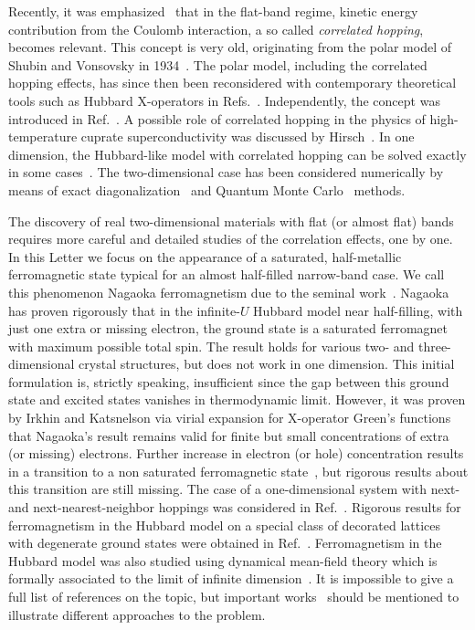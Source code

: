 Recently, it was emphasized~\cite{cea2021electrostatic} that in the flat-band regime, kinetic energy contribution from the Coulomb interaction, a so called \emph{correlated hopping}, becomes relevant.
This concept is very old, originating from the polar model of Shubin and Vonsovsky in 1934~\cite{schubin1934electron}. The polar model, including the correlated hopping effects, has since then been reconsidered with contemporary theoretical tools such as Hubbard X-operators in Refs.~\cite{vonsovsky1979some1,vonsovsky1979some2}. Independently, the concept was introduced in Ref.~\cite{foglio1979new}. A possible role of correlated hopping in the physics of high-temperature cuprate superconductivity was discussed by Hirsch~\cite{hirsch1989hole,hirsch1989bond}. In one dimension, the Hubbard-like model with correlated hopping can be solved exactly in some cases~\cite{arrachea1996anomalous,aligia2000phase}. The two-dimensional case has been considered numerically by means of exact diagonalization~\cite{gagliano1995single,arrachea2000pairing} and Quantum Monte Carlo~\cite{di2014quantum} methods. 

The discovery of real two-dimensional materials with flat (or almost flat) bands requires more careful and detailed studies of the correlation effects, one by one. In this Letter we focus on the appearance of a saturated, half-metallic ferromagnetic state typical for an almost half-filled narrow-band case. We call this phenomenon Nagaoka ferromagnetism due to the seminal work~\cite{nagaoka1966ferromagnetism}.
Nagaoka has proven rigorously that in the infinite-$U$ Hubbard model near half-filling, with just one extra or missing electron, the ground state is a saturated ferromagnet with maximum possible total spin. The result holds for various two- and three-dimensional crystal structures, but does not work in one dimension.
This initial formulation is, strictly speaking, insufficient since the gap between this ground state and excited states vanishes in thermodynamic limit. However, it was proven by Irkhin and Katsnelson via virial expansion for X-operator Green's functions~\cite{irkhin1985spin} that Nagaoka's result remains valid for finite but small concentrations of extra (or missing) electrons. Further increase in electron (or hole) concentration results in a transition to a non saturated ferromagnetic state~\cite{edwards,irkhin1990katsnelson,irkhin_zarubin}, but rigorous results about this transition are still missing.
The case of a one-dimensional system with next- and next-nearest-neighbor hoppings was considered in Ref.~\cite{muller1995ferromagnetism}. Rigorous results for ferromagnetism in the Hubbard model on a special class of decorated lattices with degenerate ground states were obtained in Ref.~\cite{mielke1993ferromagnetism}. Ferromagnetism in the Hubbard model was also studied using dynamical mean-field theory which is formally associated to the limit of infinite dimension~\cite{uhrig1996exact,held1996correlated,vollhardt1996non}. It is impossible to give a full list of references on the topic, but important works~\cite{tasaki1998nagaoka,maksymenko2012flat,mielke1999ferromagnetism,tamura2002flat,roth1969electron,jarrett1968evidence,plischke1974ferromagnetism,hanisch1997lattice} should be mentioned to illustrate different approaches to the problem.

